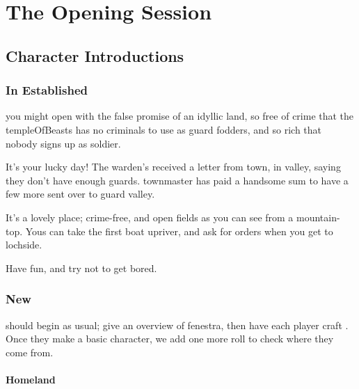 \printglossary[
  type=people,
  style=topicmcols,
  title={Places \& Politics},
]

\section{The Opening Session}
\label{theOpeningSession}

\begin{multicols}{2}

\subsection{Character Introductions}

\subsubsection{In Established }
you might open with the false promise of an idyllic land, so free of crime that the \gls{templeOfBeasts} has no criminals to use as \gls{guard} \glspl{fodder}, and so rich that nobody signs up as  \gls{soldier}.

\begin{speechtext}
  It's your lucky day!
  The \gls{warden}'s received a letter from \gls{town}, in \gls{valley}, saying they don't have enough \glspl{guard}.
  \Gls{townmaster} has paid a handsome sum to have a few more sent over to guard \gls{valley}.

  It's a lovely place; crime-free, and open fields as you can see from a mountain-top.
  Yous can take the first boat upriver, and ask for orders when you get to \gls{lochside}.

  Have fun, and try not to get bored.
\end{speechtext}

\subsubsection{New }
should begin as usual; give an overview of \gls{fenestra},%
then have each player craft .%
Once they make a basic character, we add one more roll to check where they come from.

\paragraph{Homeland}


\end{multicols}
